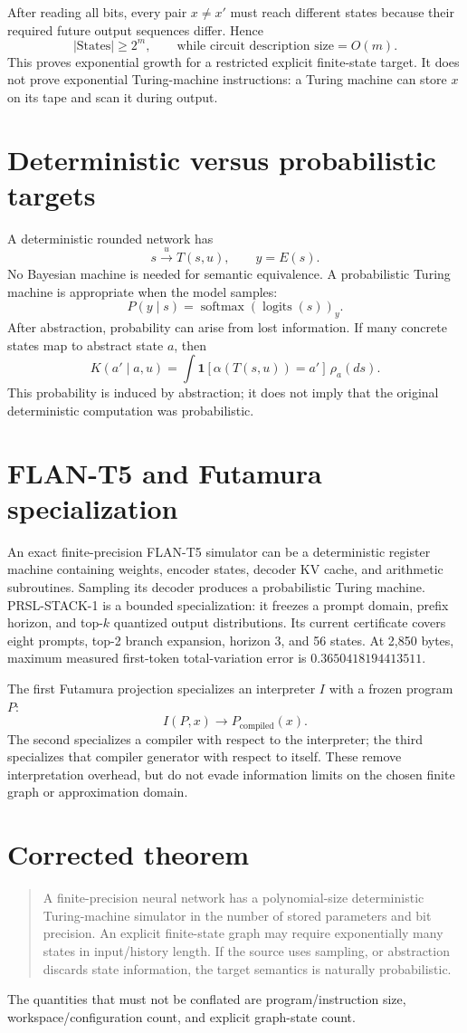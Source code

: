 \documentclass[11pt]{article}
\begin{document}
After reading all bits, every pair $x\ne x'$ must reach different states because their required future output sequences differ. Hence
\[
|\mathrm{States}|\ge 2^m,\qquad \text{while circuit description size}=O(m).
\]
This proves exponential growth for a restricted explicit finite-state target. It does not prove exponential Turing-machine instructions: a Turing machine can store $x$ on its tape and scan it during output.
\section{Deterministic versus probabilistic targets}
A deterministic rounded network has
\[
s\xrightarrow{u}T(s,u),\qquad y=E(s).
\]
No Bayesian machine is needed for semantic equivalence. A probabilistic Turing machine is appropriate when the model samples:
\[
P(y\mid s)=\operatorname{softmax}(\operatorname{logits}(s))_y.
\]
After abstraction, probability can arise from lost information. If many concrete states map to abstract state $a$, then
\[
K(a'\mid a,u)=\int \mathbf{1}[\alpha(T(s,u))=a']\,\rho_a(ds).
\]
This probability is induced by abstraction; it does not imply that the original deterministic computation was probabilistic.
\section{FLAN-T5 and Futamura specialization}
An exact finite-precision FLAN-T5 simulator can be a deterministic register machine containing weights, encoder states, decoder KV cache, and arithmetic subroutines. Sampling its decoder produces a probabilistic Turing machine. PRSL-STACK-1 is a bounded specialization: it freezes a prompt domain, prefix horizon, and top-$k$ quantized output distributions. Its current certificate covers eight prompts, top-2 branch expansion, horizon 3, and 56 states. At 2,850 bytes, maximum measured first-token total-variation error is $0.3650418194413511$.

The first Futamura projection specializes an interpreter $I$ with a frozen program $P$:
\[
I(P,x)\longrightarrow P_{\mathrm{compiled}}(x).
\]
The second specializes a compiler with respect to the interpreter; the third specializes that compiler generator with respect to itself. These remove interpretation overhead, but do not evade information limits on the chosen finite graph or approximation domain.
\section{Corrected theorem}
\begin{quote}
A finite-precision neural network has a polynomial-size deterministic Turing-machine simulator in the number of stored parameters and bit precision. An explicit finite-state graph may require exponentially many states in input/history length. If the source uses sampling, or abstraction discards state information, the target semantics is naturally probabilistic.
\end{quote}
The quantities that must not be conflated are program/instruction size, workspace/configuration count, and explicit graph-state count.
\end{document}
